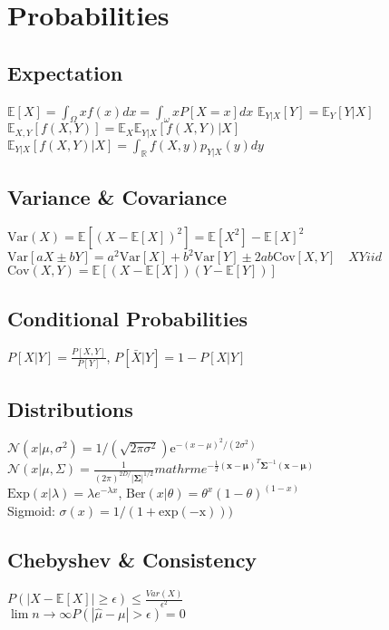 \section*{Probabilities}
\subsection*{Expectation}
$\mathbb{E}[X]=\int_{\Omega}xf(x)dx=\int_{\omega}xP[X{=}x]dx$
$\mathbb{E}_{Y|X}[Y]=\mathbb{E}_{Y}[Y|X]$\\
$\mathbb{E}_{X,Y}[f(X,Y)]=\mathbb{E}_{X}\mathbb{E}_{Y|X}[f(X,Y)|X]$\\
$\mathbb{E}_{Y|X}[f(X,Y)|X]{=}\int_\mathbb{R}f(X,y)p_{Y|X}(y)dy$

\subsection*{Variance \& Covariance}
$\mathrm{Var}(X){=}\mathbb{E}[(X{-}\mathbb{E}[X])^2]{=}\mathbb{E}[X^2]{-}\mathbb{E}[X]^2$\\
$\mathrm{Var}[{aX}\pm{bY}]{=a^2}\mathrm{Var}{[X]+b^2}\mathrm{Var}{[Y]}\pm{2ab }\mathrm{Cov}{[X,Y]}\quad XY iid$\\
$\mathrm{Cov}(X,Y)=\mathbb{E}[(X-\mathbb{E}[X])(Y-\mathbb{E}[Y])]$
\subsection*{Conditional Probabilities}
$P[X|Y]=\frac{P[X,Y]}{P[Y]}$, 
$P[\bar{X}|Y]=1-P[X|Y]$
\subsection*{Distributions}
$\mathcal{N}(x|\mu, \sigma^2)=1/(\sqrt{2\pi\sigma^2})\mathrm{e}^{-(x-\mu)^2/(2\sigma^2)}$\\
$\mathcal{N}(x|\mu, \Sigma)= \frac{1}{(2\pi)^{2D/}|\mathbf{\Sigma}|^{1/2}} mathrm{e}^{-\frac{1}{2}(\mathbf{x}-\mathbf{\mu})^T\mathbf{\Sigma}^{-1}(\mathbf{x}-\mathbf{\mu})}$\\
$\mathrm{Exp}(x|\lambda){=}\lambda e^{-\lambda x}$, $\mathrm{Ber}(x|\theta){=}\theta^x (1{-}\theta)^{(1-x)}$\\
Sigmoid: $\sigma(x)=1/(1+\mathrm{exp(-x)}))$

\subsection*{Chebyshev \& Consistency}
$P(|X-\mathbb{E}[X]|\geq \epsilon)\leq \frac{Var(X)}{\epsilon^2}$\\
$\lim{n\rightarrow\infty} P(|\hat{\mu}-\mu |>\epsilon)=0$

